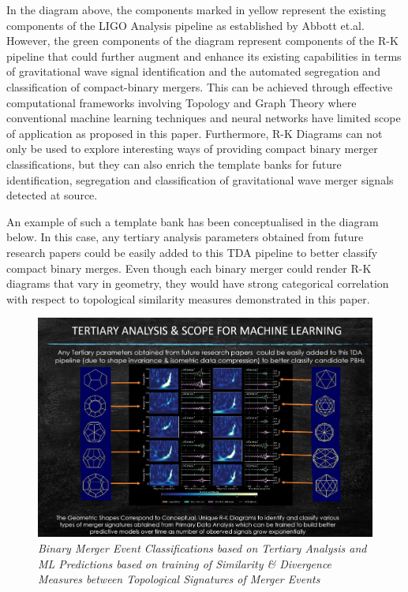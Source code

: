In the diagram above, the components marked in yellow represent the existing components of the LIGO Analysis pipeline  as established by Abbott et.al. However, the green components of the diagram represent components of the R-K pipeline that could further augment and enhance its existing capabilities in terms of gravitational wave signal identification and the automated segregation and classification of compact-binary mergers. This can be achieved through effective computational frameworks involving Topology and Graph Theory where conventional machine learning techniques and neural networks have limited scope of application as proposed in this paper. Furthermore, R-K Diagrams can not only be used to explore  interesting ways of providing compact binary merger classifications, but they can also enrich the template banks for future identification, segregation and classification of gravitational wave merger signals detected at source.

An example of such a template bank has been conceptualised in the diagram below. In this case, any tertiary analysis  parameters obtained from future research papers could be easily added to this TDA pipeline  to better classify compact binary merges. Even though each binary merger could render R-K diagrams that vary in geometry, they would have strong categorical correlation with respect to topological similarity measures demonstrated in this paper.
 

 \begin{figure}[H]
	\centering
	\includegraphics[width=1.0\linewidth]{images/79_Tertiary Analysis & ML Predictions.jpg}
	\caption{\textit{Binary Merger Event Classifications based on Tertiary Analysis and ML Predictions based on training of Similarity \& Divergence Measures between Topological Signatures of Merger Events }}
	\label{fig:LIGO18_PlaceHolder_fig}
\end{figure}

